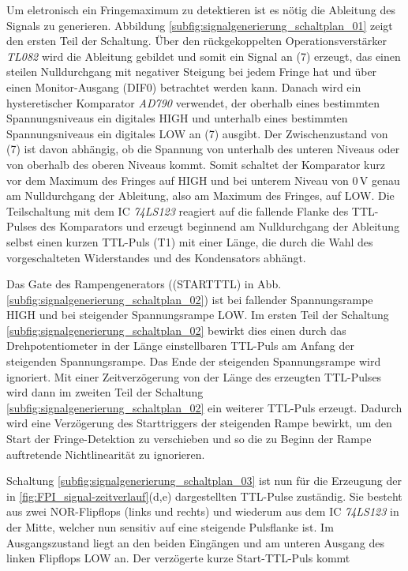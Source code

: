 Um eletronisch ein Fringemaximum zu detektieren ist es nötig die Ableitung
des Signals zu generieren. Abbildung
\ref{subfig:signalgenerierung_schaltplan_01} zeigt den ersten Teil der Schaltung. Über den rückgekoppelten Operationsverstärker
\textit{TL082} wird die Ableitung gebildet und somit ein Signal an (7)
erzeugt, das einen steilen Nulldurchgang mit negativer Steigung bei jedem Fringe hat und über einen
Monitor-Ausgang (DIF0) betrachtet werden kann. Danach wird ein
hysteretischer Komparator \textit{AD790} verwendet, der oberhalb eines
bestimmten Spannungsniveaus ein digitales HIGH und unterhalb eines bestimmten Spannungsniveaus
ein digitales LOW an (7) ausgibt. Der Zwischenzustand von (7) ist
davon abhängig, ob die Spannung von unterhalb des unteren Niveaus oder von
oberhalb des oberen Niveaus kommt. Somit schaltet der Komparator kurz vor dem
Maximum des Fringes auf HIGH und bei unterem Niveau von $0\,$V genau am
Nulldurchgang der Ableitung, also am Maximum des Fringes, auf LOW. Die
Teilschaltung mit dem IC \textit{74LS123} reagiert auf die fallende Flanke des
TTL-Pulses des Komparators und erzeugt beginnend am
Nulldurchgang der Ableitung selbst einen kurzen TTL-Puls (T1) mit einer
Länge, die durch die Wahl des vorgeschalteten Widerstandes und des Kondensators abhängt.\par
Das Gate des Rampengenerators ((STARTTTL) in Abb.
\ref{subfig:signalgenerierung_schaltplan_02}) ist bei fallender Spannungsrampe
HIGH und bei steigender Spannungsrampe LOW. Im ersten Teil der Schaltung
\ref{subfig:signalgenerierung_schaltplan_02} bewirkt dies einen durch das
Drehpotentiometer in der Länge einstellbaren TTL-Puls am Anfang der steigenden
Spannungsrampe. Das Ende der steigenden Spannungsrampe wird ignoriert.
Mit einer Zeitverzögerung von der Länge des erzeugten TTL-Pulses wird dann im
zweiten Teil der Schaltung \ref{subfig:signalgenerierung_schaltplan_02} ein weiterer TTL-Puls erzeugt.
Dadurch wird eine Verzögerung des Starttriggers der steigenden Rampe bewirkt, um
den Start der Fringe-Detektion zu verschieben und so die zu Beginn der Rampe
auftretende Nichtlinearität zu ignorieren.\par
Schaltung \ref{subfig:signalgenerierung_schaltplan_03} ist nun für die Erzeugung
der in \ref{fig:FPI_signal-zeitverlauf}(d,e) dargestellten TTL-Pulse zuständig. Sie
besteht aus zwei NOR-Flipflops (links und rechts) und wiederum aus dem IC
\textit{74LS123} in der Mitte, welcher nun sensitiv auf eine steigende
Pulsflanke ist. Im Ausgangszustand liegt an den beiden Eingängen und am unteren
Ausgang des linken Flipflops LOW an. Der verzögerte kurze Start-TTL-Puls kommt
